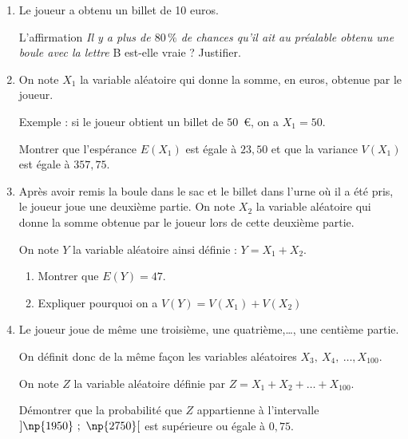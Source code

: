 \begin{enumerate}[start=4]
\item Le joueur a obtenu un billet de 10 euros.

L'affirmation \og \emph{Il y a plus de $80\,\%$ de chances qu'il ait au préalable obtenu une boule avec la lettre} B \fg{} est-elle vraie ? Justifier.
\item On note $X_1$ la variable aléatoire qui donne la somme, en euros, obtenue par le joueur.

Exemple : si le joueur obtient un billet de $50$~\euro, on a $X_1 = 50$.

Montrer que l'espérance $E(X_1)$ est égale à $23,50$ et que la variance $V(X_1)$ est égale à $357,75$.
\item Après avoir remis la boule dans le sac et le billet dans l'urne où il a été pris, le joueur joue une deuxième partie. On note $X_2 $ la variable aléatoire qui donne la somme obtenue par le joueur lors de cette deuxième partie.

On note $Y$ la variable aléatoire ainsi définie : $Y = X_1 + X_2$.
	\begin{enumerate}
		\item Montrer que $E(Y) = 47$.
		\item Expliquer pourquoi on a $V(Y) = V(X_1) + V(X_2)$
	\end{enumerate}
\item Le joueur joue de même une troisième, une quatrième,\ldots, une centième partie.

On définit donc de la même façon les variables aléatoires $X_3, \:X_4,\:\ldots, X_{100}$.

On note $Z$ la variable aléatoire définie par $Z = X_1 + X_2 + \ldots + X_{100}$.

Démontrer que la probabilité que $Z$ appartienne à l'intervalle $]\np{1950}~;~\np{2750}[$ 
 est supérieure ou égale à $0,75$.
\end{enumerate}

\noindent

\bigskip
